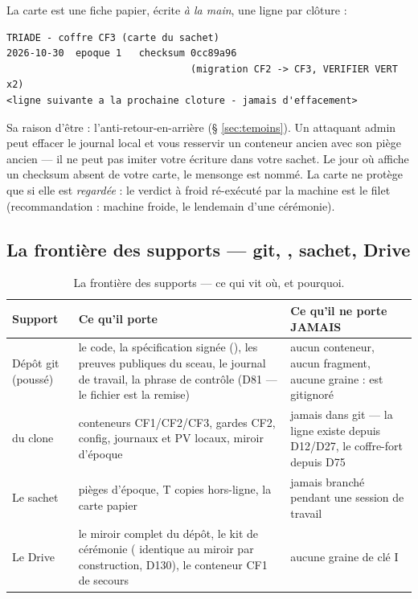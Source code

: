 La carte est une fiche papier, écrite \emph{à la main}, une ligne par clôture :

\begin{lstlisting}
TRIADE - coffre CF3 (carte du sachet)
2026-10-30  epoque 1   checksum 0cc89a96
                                (migration CF2 -> CF3, VERIFIER VERT x2)
<ligne suivante a la prochaine cloture - jamais d'effacement>
\end{lstlisting}

Sa raison d'être : l'anti-retour-en-arrière (§ \ref{sec:temoins}). Un attaquant admin
peut effacer le journal local et vous resservir un conteneur ancien avec son piège
ancien — il ne peut pas imiter votre écriture dans votre sachet. Le jour où
 affiche un checksum absent de votre carte, le mensonge est nommé.
La carte ne protège que si elle est \emph{regardée} : le verdict à froid ré-exécuté
par la machine est le filet (recommandation : machine froide, le lendemain d'une
cérémonie).

\subsection{La frontière des supports — git, , sachet, Drive}

\begin{table}[htbp]
\centering\small
\caption{La frontière des supports — ce qui vit où, et pourquoi.}
\label{tab:frontiere}
\begin{tabularx}{\textwidth}{@{}l Y Y@{}}
\toprule
\textbf{Support} & \textbf{Ce qu'il porte} & \textbf{Ce qu'il ne porte JAMAIS} \\
\midrule
Dépôt git (poussé) & le code, la spécification signée (), les preuves
publiques du sceau, le journal de travail, la phrase de contrôle (D81 — le fichier
est la remise) & aucun conteneur, aucun fragment, aucune graine :
 est gitignoré \\
 du clone & conteneurs CF1/CF2/CF3, gardes CF2, config, journaux et PV
locaux, miroir d'époque & jamais dans git — la ligne existe depuis D12/D27, le
coffre-fort depuis D75 \\
Le sachet & pièges d'époque, T copies hors-ligne, la carte papier & jamais branché
pendant une session de travail \\
Le Drive & le miroir complet du dépôt, le kit de cérémonie ( identique au
miroir par construction, D130), le conteneur CF1 de secours & aucune graine de clé I \\
\bottomrule
\end{tabularx}
\end{table}

